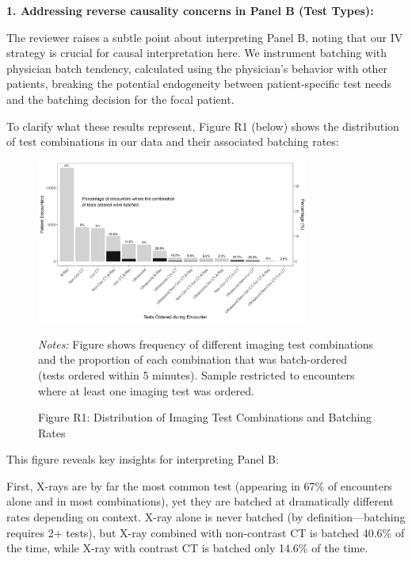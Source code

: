 \documentclass[11pt]{article}
\newcommand{\1}{\hbox{\rm 1\kern-.35em 1}}
\begin{document}
\textbf{1. Addressing reverse causality concerns in Panel B (Test Types):}

The reviewer raises a subtle point about interpreting Panel B, noting that our IV strategy is crucial for causal interpretation here. We instrument batching with physician batch tendency, calculated using the physician's behavior with other patients, breaking the potential endogeneity between patient-specific test needs and the batching decision for the focal patient.

To clarify what these results represent, Figure R1 (below) shows the distribution of test combinations in our data and their associated batching rates:

\begin{figure}[ht]
\centering
\begin{threeparttable}
\caption*{Figure R1: Distribution of Imaging Test Combinations and Batching Rates}
\includegraphics[width=0.8\textwidth]{../outputs/figures/combined_tests.png}    
\label{fig:consort}    
\begin{tablenotes}
\small
\item \textit{Notes:} Figure shows frequency of different imaging test combinations and the proportion of each combination that was batch-ordered (tests ordered within 5 minutes). Sample restricted to encounters where at least one imaging test was ordered.
\end{tablenotes}
\end{threeparttable}
\end{figure}

This figure reveals key insights for interpreting Panel B:

First, X-rays are by far the most common test (appearing in 67\% of encounters alone and in most combinations), yet they are batched at dramatically different rates depending on context. X-ray alone is never batched (by definition—batching requires 2+ tests), but X-ray combined with non-contrast CT is batched 40.6\% of the time, while X-ray with contrast CT is batched only 14.6\% of the time. 
\end{document}
